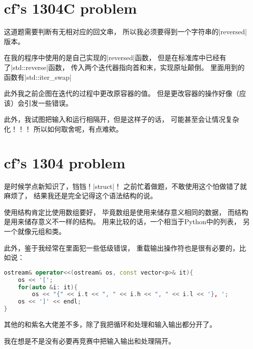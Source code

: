 \section{cf's 1304C problem}

这道题需要判断有无相对应的回文串，
所以我必须要得到一个字符串的\vb|reversed|版本。

在我的程序中使用的是自己实现的\vb|reversed|函数，
但是在标准库中已经有了\vb|std::reverse|函数，
传入两个迭代器指向首和末，实现原址颠倒。
里面用到的函数有\vb|std::iter_swap|

此外我之前企图在迭代的过程中更改原容器的值。
但是更改容器的操作好像（应该）会引发一些错误。

此外，我试图把输入和运行相隔开，但是这样子的话，
可能甚至会让情况复杂化！！！
所以如何取舍呢，有点难欸。


\section{cf's 1304 problem}

是时候学点新知识了，铛铛！\vb|struct|！
之前忙着做题，不敢使用这个怕做错了就麻烦了，
结果我还是完全记得这个语法结构的说。

使用结构肯定比使用数组要好，
毕竟数组是使用来储存意义相同的数据，
而结构是用来储存意义不一样的结构。
用来比较的话，一个相当于Python中的列表，
另一个就像元组和类。

此外，鉴于我经常在里面犯一些低级错误，
重载输出操作符也是很有必要的，比如说：
\begin{lstlisting}[language=C++]
ostream& operator<<(ostream& os, const vector<p>& it){
    os << '[';
    for(auto &i: it){
        os << "{" << i.t << ", " << i.h << ", " << i.l << '}, ';
    os << ']' << endl;
}
\end{lstlisting}

其他的和紫名大佬差不多，除了我把循环和处理和输入输出都分开了。

我在想是不是没有必要再竞赛中把输入输出和处理隔开。

